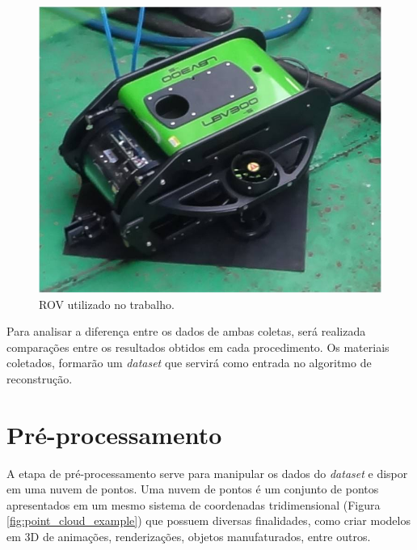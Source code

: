 \begin{figure}[H]
    \centering
    \caption{ROV utilizado no trabalho.}
    \label{fig:rov_nautec}
    \includegraphics[scale=0.5]{dados/figuras/rov_furg.jpg}
\end{figure}

Para analisar a diferença entre os dados de ambas coletas, será realizada comparações entre os resultados obtidos em cada procedimento. Os materiais coletados, formarão um \textit{dataset} que servirá como entrada no algoritmo de reconstrução.

\section{Pré-processamento}

A etapa de pré-processamento serve para manipular os dados do \textit{dataset} e dispor em uma nuvem de pontos. Uma nuvem de pontos é um conjunto de pontos apresentados em um mesmo sistema de coordenadas tridimensional (Figura \ref{fig:point_cloud_example}) que possuem diversas finalidades, como criar modelos em 3D de animações, renderizações, objetos manufaturados, entre outros. 

